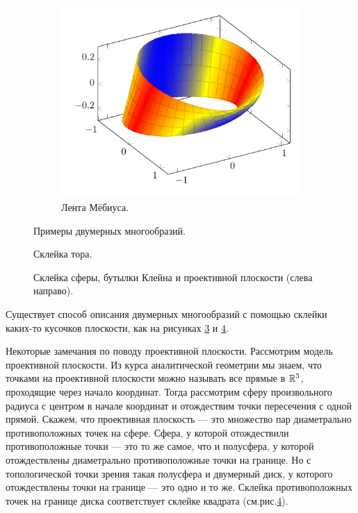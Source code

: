 \begin{figure}[htbp]
\begin{subfigure}[b]{0.48\textwidth}
        \includegraphics[scale=0.8]{images/c9.3.pdf}
        \caption{Лента Мёбиуса.}
        \label{fig:mobius}
    \end{subfigure}
    \caption{Примеры двумерных многообразий.}
    \label{fig:trio}
\end{figure}


\begin{figure}[htbp]
    \centering
    \caption{Склейка тора.}
    \label{fig:c9.5}
\end{figure}

\begin{figure}[htbp]
    \centering
    \caption{Склейка сферы, бутылки Клейна и проективной плоскости (слева направо).}
    \label{fig:c9.6}
\end{figure}

Существует способ описания двумерных многообразий с помощью склейки каких-то кусочков плоскости, как на рисунках \ref{fig:c9.5} и \ref{fig:c9.6}.

Некоторые замечания по поводу проективной плоскости. Рассмотрим модель проективной плоскости. Из курса аналитической геометрии мы знаем, что точками на проективной плоскости можно называть все прямые в $\mathbb{R}^3$, проходящие через начало координат. Тогда рассмотрим сферу произвольного радиуса с центром в начале координат и отождествим точки пересечения с одной прямой. Скажем, что проективная плоскость — это множество пар диаметрально противоположных точек на сфере. Сфера, у которой отождествили противоположные точки — это то же самое, что и полусфера, у которой отождествлены диаметрально противоположные точки на границе. Но с топологической точки зрения такая полусфера и двумерный диск, у которого отождествлены точки на границе — это одно и то же. Склейка противоположных точек на границе диска соответствует склейке квадрата (см.рис.\ref{fig:c9.6}).


